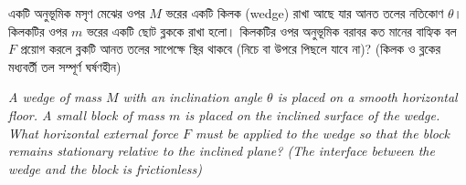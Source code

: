 \documentclass[12pt, a4paper]{article}
\begin{document}
\newpage

\begin{tcolorbox}[questionbox={প্রশ্ন (Question) 26}]
    \noindent
    একটি অনুভূমিক মসৃণ মেঝের ওপর $M$ ভরের একটি কিলক (wedge) রাখা আছে যার আনত তলের নতিকোণ $\theta$। কিলকটির ওপর $m$ ভরের একটি ছোট ব্লককে রাখা হলো। কিলকটির ওপর অনুভূমিক বরাবর কত মানের বাহ্যিক বল $F$ প্রয়োগ করলে ব্লকটি আনত তলের সাপেক্ষে স্থির থাকবে (নিচে বা উপরে পিছলে যাবে না)? (কিলক ও ব্লকের মধ্যবর্তী তল সম্পূর্ণ ঘর্ষণহীন)
    
    \vspace{0.8em}
    \begin{english}
    \noindent\textit{\color{darkgray}
    A wedge of mass $M$ with an inclination angle $\theta$ is placed on a smooth horizontal floor. A small block of mass $m$ is placed on the inclined surface of the wedge. What horizontal external force $F$ must be applied to the wedge so that the block remains stationary relative to the inclined plane? (The interface between the wedge and the block is frictionless)
    }
    \end{english}
\end{tcolorbox}
\end{document}
